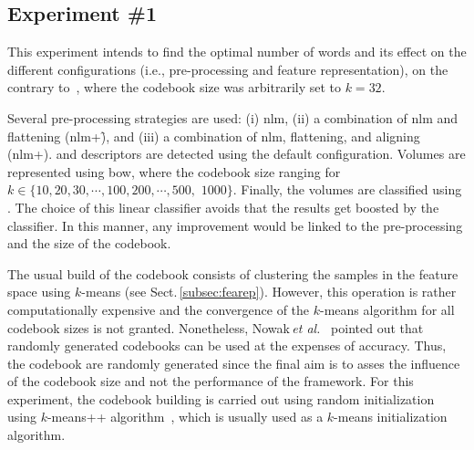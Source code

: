 \subsection{Experiment \#1}\label{subsec:exp1}
%
%
%
%

This experiment intends to find the optimal number of words and its effect on the different configurations (i.e., pre-processing and feature representation), on the contrary to~\cite{Lemaintre2015miccaiOCT}, where the codebook size was arbitrarily set to $k = 32$.


Several pre-processing strategies are used: (i) \ac{nlm}, (ii) a combination of \ac{nlm} and flattening (\ac{nlm}+\f), and (iii) a combination of \ac{nlm}, flattening, and aligning (\ac{nlm}+\fal).
\lbp and \lbptop descriptors are detected using the default configuration.
Volumes are represented using \ac{bow}, where the codebook size ranging for $k\in \{10, 20, 30, \cdots, 100, 200, \cdots, 500,$ $1000\}$.
Finally, the volumes are classified using \lr.
The choice of this linear classifier avoids that the results get boosted by the classifier.
In this manner, any improvement would be linked to the pre-processing and the size of the codebook.
%

The usual build of the codebook consists of clustering the samples in the feature space using $k$-means (see Sect.\,\ref{subsec:fearep}).
However, this operation is rather computationally expensive and the convergence of the $k$-means algorithm for all codebook sizes is not granted.
Nonetheless, Nowak\,\textit{et al.}~\cite{nowak2006sampling} pointed out that randomly generated codebooks can be used at the expenses of accuracy.
Thus, the codebook are randomly generated since the final aim is to asses the influence of the codebook size and not the performance of the framework.
For this experiment, the codebook building is carried out using random initialization using $k$-means++ algorithm~\cite{arthur2007k}, which is usually used as a $k$-means initialization algorithm.


